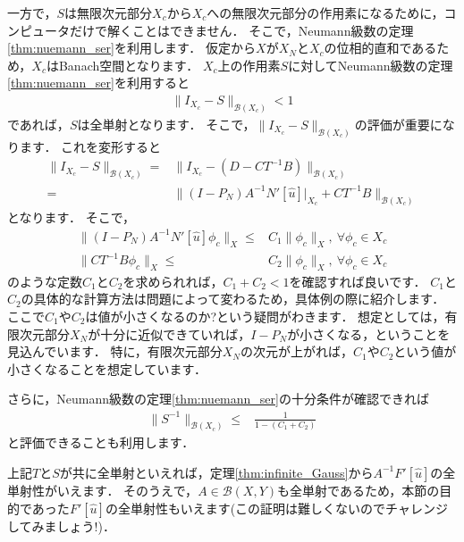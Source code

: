 一方で，$S$は無限次元部分$X_c$から$X_c$への無限次元部分の作用素になるために，コンピュータだけで解くことはできません．
そこで，Neumann級数の定理\ref{thm:nuemann_ser}を利用します．
仮定から$X$が$X_N$と$X_c$の位相的直和であるため，$X_c$はBanach空間となります．
$X_c$上の作用素$S$に対してNeumann級数の定理\ref{thm:nuemann_ser}を利用すると
\begin{align*}
	\| I_{X_c} - S \|_{{\mathcal B}(X_c)} < 1
\end{align*}
であれば，$S$は全単射となります．
そこで，$\| I_{X_c} - S \|_{{\mathcal B}(X_c)}$の評価が重要になります．
これを変形すると
\begin{align*}
	\| I_{X_c} - S \|_{{\mathcal B}(X_c)} =& \| I_{X_c} - (D - CT^{-1}B) \|_{{\mathcal B}(X_c)} \\
	=& \| (I - P_N) A^{-1} N'[\hat{u}] |_{X_c} + CT^{-1}B \|_{{\mathcal B}(X_c)}
\end{align*}
となります．
そこで，
\begin{align*}
	\| (I - P_N) A^{-1} N'[\hat{u}] \phi_c \|_{X} \le& C_1 \| \phi_c \|_{X}, ~ \forall \phi_c \in X_c \\
	\| CT^{-1}B \phi_c \|_{X} \le& C_2 \| \phi_c \|_{X}, ~ \forall \phi_c \in X_c
\end{align*}
のような定数$C_1$と$C_2$を求められれば，$C_1 + C_2 < 1$を確認すれば良いです．
$C_1$と$C_2$の具体的な計算方法は問題によって変わるため，具体例の際に紹介します．
ここで$C_1$や$C_2$は値が小さくなるのか?という疑問がわきます．
想定としては，有限次元部分$X_N$が十分に近似できていれば，$I-P_N$が小さくなる，ということを見込んでいます．
特に，有限次元部分$X_N$の次元が上がれば，$C_1$や$C_2$という値が小さくなることを想定しています．

さらに，Neumann級数の定理\ref{thm:nuemann_ser}の十分条件が確認できれば
\begin{align*}
	\| S^{-1} \|_{{\mathcal B}(X_c)} \le& \frac{1}{1 - (C_1 + C_2)}
\end{align*}
と評価できることも利用します．


上記$T$と$S$が共に全単射といえれば，定理\ref{thm:infinite_Gauss}から$A^{-1} F'[\hat{u}]$の全単射性がいえます．
そのうえで，$A \in {\mathcal B}(X, Y)$も全単射であるため，本節の目的であった$F'[\hat{u}]$の全単射性もいえます(この証明は難しくないのでチャレンジしてみましょう!)．




%
